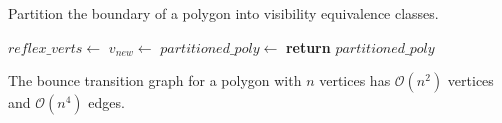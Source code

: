 \documentclass[]{styles/svproc}  %
\begin{document}
\begin{algorithm}
\caption{Partition the boundary of a polygon into visibility
equivalence classes.}
\label{algo:insert}
\begin{algorithmic}
\State $reflex\_verts \gets$ 
     
        \State $v_{new} \gets$ 
    \EndFor
\EndFor
\State $partitioned\_poly \gets$ 
\State \textbf{return} $partitioned\_poly$
\EndProcedure
\end{algorithmic}
\end{algorithm}

\begin{proposition} The bounce transition graph for a polygon with $n$ vertices has 
$\mathcal{O}(n^2)$ vertices and $\mathcal{O}(n^4)$ edges.
\end{proposition}
\end{document}
